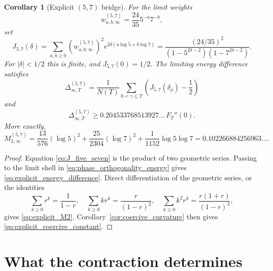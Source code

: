 \documentclass[11pt]{amsart}
\numberwithin{equation}{section}
\theoremstyle{plain}
\newtheorem{corollary}[theorem]{Corollary}
\theoremstyle{definition}
\theoremstyle{remark}
\begin{document}
\begin{corollary}[Explicit $(5,7)$ bridge]
\label{cor:explicit_five_seven_bridge}
For the limit weights
\begin{equation}
w_{a,b;\infty}^{(5,7)}=\frac{24}{35}5^{-a}7^{-b},
\label{eq:five_seven_limit_weights}
\end{equation}
set
\begin{equation}
J_{5,7}(\delta)
=
\sum_{a,b\geq0}
\left(w_{a,b;\infty}^{(5,7)}\right)^2
e^{2\delta(a\log5+b\log7)}
=
\frac{(24/35)^2}
{(1-5^{2\delta-2})(1-7^{2\delta-2})}.
\label{eq:J_five_seven}
\end{equation}
For $|\delta|<1/2$ this is finite, and $J_{5,7}(0)=1/2$.  The limiting energy difference satisfies
\begin{equation}
\Delta_{\infty,T}^{(5,7)}
=
\frac1{N(T)}
\sum_{0<\gamma\leq T}
\left(J_{5,7}(\delta_\rho)-\frac12\right)
\label{eq:explicit_energy_difference}
\end{equation}
and
\begin{equation}
\boxed{
\Delta_{\infty,T}^{(5,7)}
\geq
0.204533768513927\ldots\,F_T''(0).}
\label{eq:explicit_coercive_constant}
\end{equation}
More exactly,
\begin{equation}
M_{2,\infty}^{(5,7)}
=
\frac{13}{576}(\log5)^2
+\frac{25}{2304}(\log7)^2
+\frac{1}{1152}\log5\log7
=0.102266884256963\ldots.
\label{eq:explicit_M2}
\end{equation}
\end{corollary}

\begin{proof}
Equation \eqref{eq:J_five_seven} is the product of two geometric series.
Passing to the limit shell in \eqref{eq:phase_orthogonality_energy} gives
\eqref{eq:explicit_energy_difference}.  Direct differentiation of the geometric series, or the identities
\begin{equation}
\sum_{k\geq0}r^k=\frac1{1-r},
\quad
\sum_{k\geq0}kr^k=\frac{r}{(1-r)^2},
\quad
\sum_{k\geq0}k^2r^k=\frac{r(1+r)}{(1-r)^3},
\label{eq:geometric_moments}
\end{equation}
gives \eqref{eq:explicit_M2}.  Corollary~\ref{cor:coercive_curvature} then gives \eqref{eq:explicit_coercive_constant}.
\end{proof}

\section{What the contraction determines}
\label{sec:scope}
\end{document}
